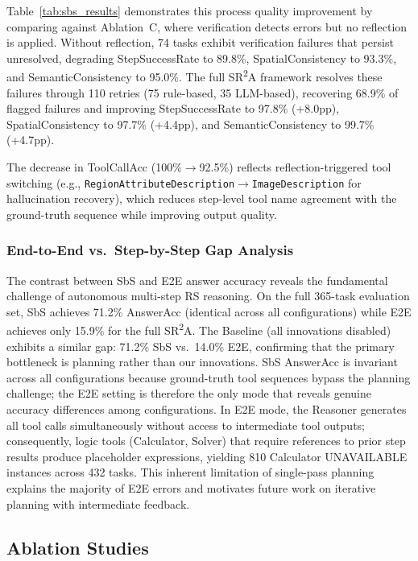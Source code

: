 \documentclass[journal]{IEEEtran}
\begin{document}
Table~\ref{tab:sbs_results} demonstrates this process quality improvement by comparing against Ablation~C, where verification detects errors but no reflection is applied.
Without reflection, 74 tasks exhibit verification failures that persist unresolved, degrading StepSuccessRate to 89.8\%, SpatialConsistency to 93.3\%, and SemanticConsistency to 95.0\%.
The full SR\textsuperscript{2}A framework resolves these failures through 110 retries (75 rule-based, 35 LLM-based), recovering 68.9\% of flagged failures and improving StepSuccessRate to 97.8\% (+8.0pp), SpatialConsistency to 97.7\% (+4.4pp), and SemanticConsistency to 99.7\% (+4.7pp).

The decrease in ToolCallAcc (100\%$\rightarrow$92.5\%) reflects reflection-triggered tool switching (e.g., \texttt{RegionAttributeDescription}$\rightarrow$\texttt{ImageDescription} for hallucination recovery), which reduces step-level tool name agreement with the ground-truth sequence while improving output quality.

\subsubsection{End-to-End vs.\ Step-by-Step Gap Analysis}

The contrast between SbS and E2E answer accuracy reveals the fundamental challenge of autonomous multi-step RS reasoning.
On the full 365-task evaluation set, SbS achieves 71.2\% AnswerAcc (identical across all configurations) while E2E achieves only 15.9\% for the full SR\textsuperscript{2}A.
The Baseline (all innovations disabled) exhibits a similar gap: 71.2\% SbS vs.\ 14.0\% E2E, confirming that the primary bottleneck is planning rather than our innovations.
SbS AnswerAcc is invariant across all configurations because ground-truth tool sequences bypass the planning challenge; the E2E setting is therefore the only mode that reveals genuine accuracy differences among configurations.
In E2E mode, the Reasoner generates all tool calls simultaneously without access to intermediate tool outputs; consequently, logic tools (Calculator, Solver) that require references to prior step results produce placeholder expressions, yielding 810 Calculator UNAVAILABLE instances across 432 tasks.
This inherent limitation of single-pass planning explains the majority of E2E errors and motivates future work on iterative planning with intermediate feedback.


\subsection{Ablation Studies}
\label{subsec:ablation}
\end{document}
